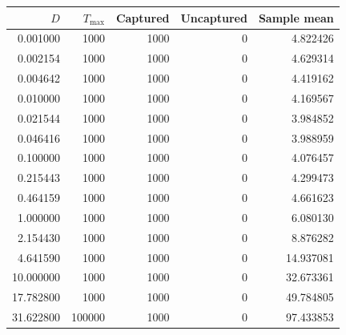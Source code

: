 \begin{tabular}{rrrrr}
\toprule
$D$ & $T_{\max}$ & Captured & Uncaptured & Sample mean \\
\midrule
0.001000 & 1000 & 1000 & 0 & 4.822426 \\
0.002154 & 1000 & 1000 & 0 & 4.629314 \\
0.004642 & 1000 & 1000 & 0 & 4.419162 \\
0.010000 & 1000 & 1000 & 0 & 4.169567 \\
0.021544 & 1000 & 1000 & 0 & 3.984852 \\
0.046416 & 1000 & 1000 & 0 & 3.988959 \\
0.100000 & 1000 & 1000 & 0 & 4.076457 \\
0.215443 & 1000 & 1000 & 0 & 4.299473 \\
0.464159 & 1000 & 1000 & 0 & 4.661623 \\
1.000000 & 1000 & 1000 & 0 & 6.080130 \\
2.154430 & 1000 & 1000 & 0 & 8.876282 \\
4.641590 & 1000 & 1000 & 0 & 14.937081 \\
10.000000 & 1000 & 1000 & 0 & 32.673361 \\
17.782800 & 1000 & 1000 & 0 & 49.784805 \\
31.622800 & 100000 & 1000 & 0 & 97.433853 \\
\bottomrule
\end{tabular}
